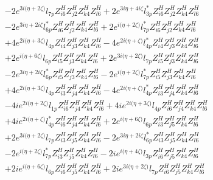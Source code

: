 \begin{align}
 &-2 e^{3 i \Big(\eta +2 \zeta \Big)} l_{7p} Z_{{i 6}}^{H} Z_{{j 2}}^{H} Z_{{k 4}}^{H} Z_{{l 6}}^{H} +2 e^{3 i \eta +4 i \zeta } l_{3p}^* Z_{{i 6}}^{H} Z_{{j 2}}^{H} Z_{{k 4}}^{H} Z_{{l 6}}^{H} \nonumber \\ 
 &-2 e^{3 i \eta +2 i \zeta } l_{6p}^* Z_{{i 6}}^{H} Z_{{j 2}}^{H} Z_{{k 4}}^{H} Z_{{l 6}}^{H} +2 e^{i \Big(\eta +2 \zeta \Big)} l_{7p}^* Z_{{i 6}}^{H} Z_{{j 2}}^{H} Z_{{k 4}}^{H} Z_{{l 6}}^{H} \nonumber \\ 
 &+4 e^{2 i \Big(\eta +3 \zeta \Big)} l_{4p} Z_{{i 4}}^{H} Z_{{j 3}}^{H} Z_{{k 4}}^{H} Z_{{l 6}}^{H} -4 e^{2 i \Big(\eta +\zeta \Big)} l_{4p}^* Z_{{i 4}}^{H} Z_{{j 3}}^{H} Z_{{k 4}}^{H} Z_{{l 6}}^{H} \nonumber \\ 
 &+2 e^{i \Big(\eta +6 \zeta \Big)} l_{6p} Z_{{i 5}}^{H} Z_{{j 3}}^{H} Z_{{k 4}}^{H} Z_{{l 6}}^{H} +2 e^{3 i \Big(\eta +2 \zeta \Big)} l_{7p} Z_{{i 5}}^{H} Z_{{j 3}}^{H} Z_{{k 4}}^{H} Z_{{l 6}}^{H} \nonumber \\ 
 &-2 e^{3 i \eta +2 i \zeta } l_{6p}^* Z_{{i 5}}^{H} Z_{{j 3}}^{H} Z_{{k 4}}^{H} Z_{{l 6}}^{H} -2 e^{i \Big(\eta +2 \zeta \Big)} l_{7p}^* Z_{{i 5}}^{H} Z_{{j 3}}^{H} Z_{{k 4}}^{H} Z_{{l 6}}^{H} \nonumber \\ 
 &+4 e^{2 i \Big(\eta +3 \zeta \Big)} l_{4p} Z_{{i 3}}^{H} Z_{{j 4}}^{H} Z_{{k 4}}^{H} Z_{{l 6}}^{H} -4 e^{2 i \Big(\eta +\zeta \Big)} l_{4p}^* Z_{{i 3}}^{H} Z_{{j 4}}^{H} Z_{{k 4}}^{H} Z_{{l 6}}^{H} \nonumber \\ 
 &-4 i e^{2 i \Big(\eta +2 \zeta \Big)} l_{1p} Z_{{i 6}}^{H} Z_{{j 4}}^{H} Z_{{k 4}}^{H} Z_{{l 6}}^{H} +4 i e^{2 i \Big(\eta +3 \zeta \Big)} l_{4p} Z_{{i 6}}^{H} Z_{{j 4}}^{H} Z_{{k 4}}^{H} Z_{{l 6}}^{H} \nonumber \\ 
 &+4 i e^{2 i \Big(\eta +\zeta \Big)} l_{4p}^* Z_{{i 6}}^{H} Z_{{j 4}}^{H} Z_{{k 4}}^{H} Z_{{l 6}}^{H} +2 e^{i \Big(\eta +6 \zeta \Big)} l_{6p} Z_{{i 3}}^{H} Z_{{j 5}}^{H} Z_{{k 4}}^{H} Z_{{l 6}}^{H} \nonumber \\ 
 &+2 e^{3 i \Big(\eta +2 \zeta \Big)} l_{7p} Z_{{i 3}}^{H} Z_{{j 5}}^{H} Z_{{k 4}}^{H} Z_{{l 6}}^{H} -2 e^{3 i \eta +2 i \zeta } l_{6p}^* Z_{{i 3}}^{H} Z_{{j 5}}^{H} Z_{{k 4}}^{H} Z_{{l 6}}^{H} \nonumber \\ 
 &-2 e^{i \Big(\eta +2 \zeta \Big)} l_{7p}^* Z_{{i 3}}^{H} Z_{{j 5}}^{H} Z_{{k 4}}^{H} Z_{{l 6}}^{H} -2 i e^{i \Big(\eta +4 \zeta \Big)} l_{3p} Z_{{i 6}}^{H} Z_{{j 5}}^{H} Z_{{k 4}}^{H} Z_{{l 6}}^{H} \nonumber \\ 
 &+2 i e^{i \Big(\eta +6 \zeta \Big)} l_{6p} Z_{{i 6}}^{H} Z_{{j 5}}^{H} Z_{{k 4}}^{H} Z_{{l 6}}^{H} +2 i e^{3 i \Big(\eta +2 \zeta \Big)} l_{7p} Z_{{i 6}}^{H} Z_{{j 5}}^{H} Z_{{k 4}}^{H} Z_{{l 6}}^{H} \nonumber \\ 

\end{align}
